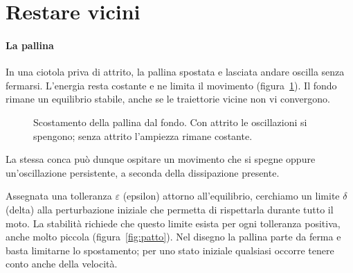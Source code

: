 \documentclass[11pt,a4paper,twoside=false,headinclude,footinclude]{scrartcl}
\begin{document}
\section{Restare vicini}\label{sec:vicini}

\paragraph{La pallina} In una ciotola priva di attrito, la pallina spostata e lasciata andare oscilla senza fermarsi. L'energia resta costante e ne limita il movimento (figura~\ref{fig:duegrafici}). Il fondo rimane un equilibrio stabile, anche se le traiettorie vicine non vi convergono.

\begin{figure}[htbp]
\centering
{}
\caption{Scostamento della pallina dal fondo. Con attrito le oscillazioni si spengono; senza attrito l'ampiezza rimane costante.}
\label{fig:duegrafici}
\end{figure}

La stessa conca può dunque ospitare un movimento che si spegne oppure un'oscillazione persistente, a seconda della dissipazione presente.

Assegnata una tolleranza $\varepsilon$ (epsilon) attorno all'equilibrio, cerchiamo un limite $\delta$ (delta) alla perturbazione iniziale che permetta di rispettarla durante tutto il moto. La stabilità richiede che questo limite esista per ogni tolleranza positiva, anche molto piccola (figura~\ref{fig:patto}). Nel disegno la pallina parte da ferma e basta limitarne lo spostamento; per uno stato iniziale qualsiasi occorre tenere conto anche della velocità.
\end{document}
